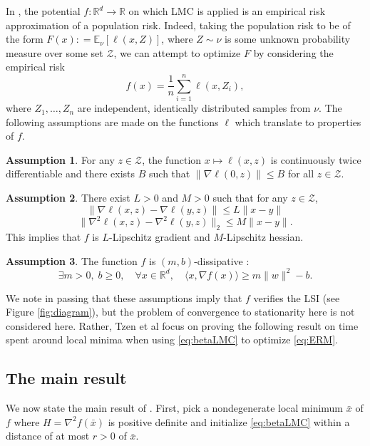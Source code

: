 \documentclass[10pt,journal,a4paper]{IEEEtran}
\theoremstyle{definition}
\newtheorem{assumption}{Assumption}
\newcommand{\E}{\mathbb{E}}
\newcommand{\R}{\mathbb{R}}
\begin{document}
In \cite{tzen_local_2018}, the potential $f: \R^d \rightarrow \R$ on which LMC is applied is an empirical risk approximation of a population risk. Indeed, taking the population risk to be of the form
\(
F(x) : = \E_\nu [\ell(x, Z)]
\), where $Z \sim \nu$ is some unknown probability measure over some set $\mathcal{Z}$, we can attempt to optimize $F$ by considering the empirical risk
\begin{equation}
f(x) = \frac{1}{n} \sum_{i=1}^{n}\ell(x, Z_i),
\label{eq:ERM}
\end{equation}
where $Z_1, \dots, Z_n$ are independent, identically distributed samples from $\nu$. The following assumptions are made on the functions $\ell$ which translate to properties of $f$.
\begin{assumption}
  For any $z \in \mathcal{Z}$, the function $x \mapsto \ell(x, z)$ is continuously twice differentiable and there exists $B$ such that $\| \nabla \ell (0, z) \| \leq B$ for all $z \in \mathcal{Z}$.
\end{assumption}
\begin{assumption}
  There exist $L > 0$ and $M> 0$ such that for any $z \in \mathcal{Z}$,
  \[
  \| \nabla \ell(x, z) - \nabla \ell(y, z)\| \leq L \|x - y\|\]\[ \| \nabla^2 \ell(x, z) - \nabla^2 \ell(y, z)\|_2 \leq M \|x - y\|.
  \]
  This implies that $f$ is $L$-Lipschitz gradient and $M$-Lipschitz hessian.
\end{assumption}
\begin{assumption}
  The function $f$ is $(m, b)$-dissipative :
  \[
  \exists m>0, \; b\geq 0, \quad \forall x \in \R^d, \quad \langle x, \nabla f(x) \rangle \geq m \|w\|^2 - b.
  \]
  \label{ass:dissip}
\end{assumption}

We note in passing that these assumptions imply that $f$ verifies the LSI (see Figure \ref{fig:diagram}), but the problem of convergence to stationarity here is not considered here. Rather, Tzen et al focus on proving the following result on time spent around local minima when using \eqref{eq:betaLMC} to optimize \eqref{eq:ERM}.

\subsection{The main result}

We now state the main result of \cite{tzen_local_2018}. First, pick a nondegenerate local minimum $\bar{x}$ of $f$ where $H = \nabla^2f(\bar{x})$ is positive definite and initialize \eqref{eq:betaLMC} within a distance of at most $r > 0$ of $\bar{x}$. 
\end{document}
